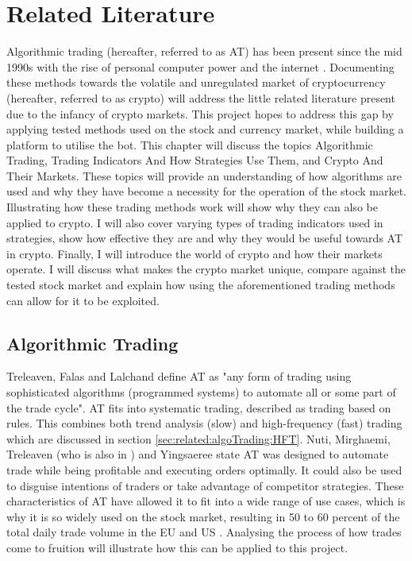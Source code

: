 %
\chapter{Related Literature}
\label{sec:related}
Algorithmic trading (hereafter, referred to as AT) has been present since the mid 1990s with the rise of personal computer power and the internet \cite{WEB:PISANI:2010}. Documenting these methods towards the volatile and unregulated market of cryptocurrency (hereafter, referred to as crypto) will address the little related literature present due to the infancy of crypto markets. This project hopes to address this gap by applying tested methods used on the stock and currency market, while building a platform to utilise the bot. This chapter will discuss the topics Algorithmic Trading, Trading Indicators And How Strategies Use Them, and Crypto And Their Markets. These topics will provide an understanding of how algorithms are used and why they have become a necessity for the operation of the stock market. Illustrating how these trading methods work will show why they can also be applied to crypto. I will also cover varying types of trading indicators used in strategies, show how effective they are and why they would be useful towards AT in crypto. Finally, I will introduce the world of crypto and how their markets operate. I will discuss what makes the crypto market unique, compare against the tested stock market and explain how using the aforementioned trading methods can allow for it to be exploited. 


\section{Algorithmic Trading}
\label{sec:related:algoTrading}
\noindent Treleaven, Falas and Lalchand \cite{ART:Treleaven:2013} define AT as "any form of trading using sophisticated algorithms (programmed systems) to automate all or some part of the trade cycle". AT fits into systematic trading, described as trading based on rules. This combines both trend analysis (slow) and high-frequency (fast) trading which are discussed in section \ref{sec:related:algoTrading:HFT}. Nuti, Mirghaemi, Treleaven (who is also in \cite{ART:Treleaven:2013}) and Yingsaeree \cite{ART:Nuti:2011} state AT was designed to automate trade while being profitable and executing orders optimally. It could also be used to disguise intentions of traders or take advantage of competitor strategies. These characteristics of AT have allowed it to fit into a wide range of use cases, which is why it is so widely used on the stock market, resulting in 50 to 60 percent of the total daily trade volume in the EU and US \cite{ART:Nuti:2011}. Analysing the process of how trades come to fruition will illustrate how this can be applied to this project.

